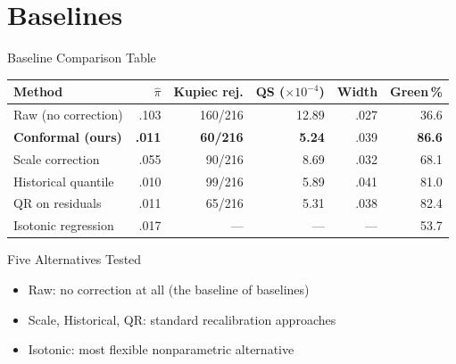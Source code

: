 \documentclass[9pt, aspectratio=169, t]{beamer}
\begin{document}
\section{Baselines}
\begin{frame}{Baseline Comparison Table}
	\vspace{-0.2cm}
	{\footnotesize
	\begin{center}
	\begin{tabular}{@{}lrrrrr@{}}
	\toprule
	Method & $\hat\pi$ & Kupiec rej. & QS ($\times 10^{-4}$) & Width & Green\,\% \\
	\midrule
	Raw (no correction)    & .103 & 160/216 & 12.89 & .027 & 36.6 \\
	\textbf{Conformal (ours)} & \textbf{.011} & \textbf{60/216} & \textbf{5.24} & .039 & \textbf{86.6} \\
	Scale correction       & .055 &  90/216 &  8.69 & .032 & 68.1 \\
	Historical quantile    & .010 &  99/216 &  5.89 & .041 & 81.0 \\
	QR on residuals        & .011 &  65/216 &  5.31 & .038 & 82.4 \\
	Isotonic regression    & .017 &    ---  &  ---  & ---  & 53.7 \\
	\bottomrule
	\end{tabular}
	\end{center}
	}
	\vspace{2mm}
	{\footnotesize
	\begin{block}{Five Alternatives Tested}
		\begin{itemize}\setlength{\itemsep}{1pt}
			\item Raw: no correction at all (the baseline of baselines)
			\item Scale, Historical, QR: standard recalibration approaches
			\item Isotonic: most flexible nonparametric alternative
		\end{itemize}
	\end{block}
	}
\end{frame}
\end{document}
